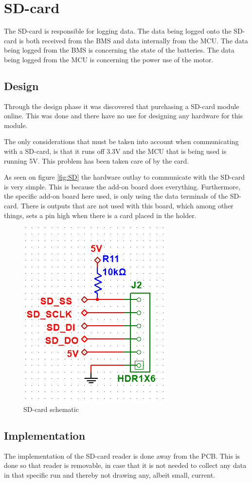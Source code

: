 \section{SD-card}
The SD-card is responsible for logging data. The data being logged onto the SD-card is both received from the BMS and data internally from the MCU. The data being logged from the BMS is concerning the state of the batteries. The data being logged from the MCU is concerning the power use of the motor.

\subsection{Design}
Through the design phase it was discovered that purchasing a SD-card module online. This was done and there have no use for designing any hardware for this module. 

The only considerations that must be taken into account when communicating with a SD-card, is that it runs off 3.3V and the MCU that is being used is running 5V. This problem has been taken care of by the card.

As seen on figure \vref{fig:SD} the hardware outlay to communicate with the SD-card is very simple. This is because the add-on board does everything. Furthermore, the specific add-on board here used, is only using the data terminals of the SD-card. There is outputs that are not used with this board, which among other things, sets a pin high when there is a card placed in the holder. 

\begin{figure}[H]
	\centering
	\includegraphics[width=0.4\linewidth]{Hardware/Pictures/SD_card}
	\caption{SD-card schematic}
	\label{fig:SD}
\end{figure}

\subsection{Implementation}
The implementation of the SD-card reader is done away from the PCB. This is done so that reader is removable, in case that it is not needed to collect any data in that specific run and thereby not drawing any, albeit small, current.  

